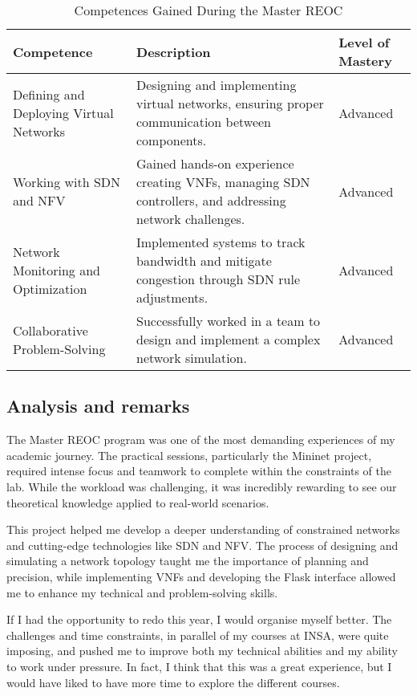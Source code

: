 \begin{table}[h!]
    \centering
    \begin{tabular}{|p{3.5cm}|p{8cm}|p{3.5cm}|}
    \hline
    \textbf{Competence} & \textbf{Description} & \textbf{Level of Mastery} \\
    \hline
    Defining and Deploying Virtual Networks & Designing and implementing virtual networks, ensuring proper communication between components. & Advanced \\
    \hline
    Working with SDN and NFV & Gained hands-on experience creating VNFs, managing SDN controllers, and addressing network challenges. & Advanced \\
    \hline
    Network Monitoring and Optimization & Implemented systems to track bandwidth and mitigate congestion through SDN rule adjustments. & Advanced\\
    \hline
    Collaborative Problem-Solving & Successfully worked in a team to design and implement a complex network simulation. & Advanced\\
    \hline
    \end{tabular}
    \caption{Competences Gained During the Master REOC}
\end{table}

\subsection{Analysis and remarks}
The Master REOC program was one of the most demanding experiences of my academic journey.
The practical sessions, particularly the Mininet project, required intense focus and teamwork to complete within the constraints of the lab.
While the workload was challenging, it was incredibly rewarding to see our theoretical knowledge applied to real-world scenarios.

This project helped me develop a deeper understanding of constrained networks and cutting-edge technologies like SDN and NFV.
The process of designing and simulating a network topology taught me the importance of planning and precision, while implementing VNFs and developing the Flask interface allowed me to enhance my technical and problem-solving skills.

If I had the opportunity to redo this year, I would organise myself better.
The challenges and time constraints, in parallel of my courses at INSA, were quite imposing, and pushed me to improve both my technical abilities and my ability to work under pressure.
In fact, I think that this was a great experience, but I would have liked to have more time to explore the different courses.